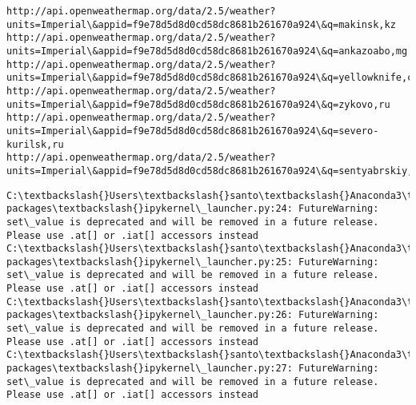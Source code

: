 \documentclass[11pt]{article}
\begin{document}
    \begin{Verbatim}[commandchars=\\\{\}]
http://api.openweathermap.org/data/2.5/weather?units=Imperial\&appid=f9e78d5d8d0cd58dc8681b261670a924\&q=makinsk,kz
http://api.openweathermap.org/data/2.5/weather?units=Imperial\&appid=f9e78d5d8d0cd58dc8681b261670a924\&q=ankazoabo,mg
http://api.openweathermap.org/data/2.5/weather?units=Imperial\&appid=f9e78d5d8d0cd58dc8681b261670a924\&q=yellowknife,ca
http://api.openweathermap.org/data/2.5/weather?units=Imperial\&appid=f9e78d5d8d0cd58dc8681b261670a924\&q=zykovo,ru
http://api.openweathermap.org/data/2.5/weather?units=Imperial\&appid=f9e78d5d8d0cd58dc8681b261670a924\&q=severo-kurilsk,ru
http://api.openweathermap.org/data/2.5/weather?units=Imperial\&appid=f9e78d5d8d0cd58dc8681b261670a924\&q=sentyabrskiy,ru

    \end{Verbatim}

    \begin{Verbatim}[commandchars=\\\{\}]
C:\textbackslash{}Users\textbackslash{}santo\textbackslash{}Anaconda3\textbackslash{}envs\textbackslash{}PythonData\textbackslash{}lib\textbackslash{}site-packages\textbackslash{}ipykernel\_launcher.py:24: FutureWarning: set\_value is deprecated and will be removed in a future release. Please use .at[] or .iat[] accessors instead
C:\textbackslash{}Users\textbackslash{}santo\textbackslash{}Anaconda3\textbackslash{}envs\textbackslash{}PythonData\textbackslash{}lib\textbackslash{}site-packages\textbackslash{}ipykernel\_launcher.py:25: FutureWarning: set\_value is deprecated and will be removed in a future release. Please use .at[] or .iat[] accessors instead
C:\textbackslash{}Users\textbackslash{}santo\textbackslash{}Anaconda3\textbackslash{}envs\textbackslash{}PythonData\textbackslash{}lib\textbackslash{}site-packages\textbackslash{}ipykernel\_launcher.py:26: FutureWarning: set\_value is deprecated and will be removed in a future release. Please use .at[] or .iat[] accessors instead
C:\textbackslash{}Users\textbackslash{}santo\textbackslash{}Anaconda3\textbackslash{}envs\textbackslash{}PythonData\textbackslash{}lib\textbackslash{}site-packages\textbackslash{}ipykernel\_launcher.py:27: FutureWarning: set\_value is deprecated and will be removed in a future release. Please use .at[] or .iat[] accessors instead

    \end{Verbatim}
\end{document}
